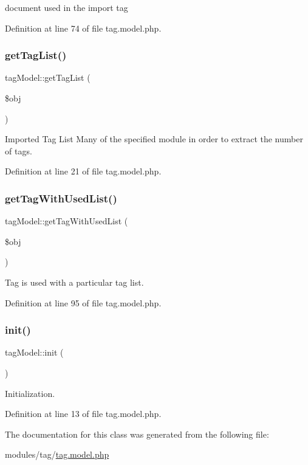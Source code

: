 document used in the import tag 



Definition at line 74 of file tag.\+model.\+php.

\hypertarget{classtagModel_adb9465eef985504d91a2b8673e4339f3}{}\label{classtagModel_adb9465eef985504d91a2b8673e4339f3} 
\subsubsection{\texorpdfstring{get\+Tag\+List()}{getTagList()}}
{\footnotesize\ttfamily tag\+Model\+::get\+Tag\+List (\begin{DoxyParamCaption}\item[{}]{\$obj }\end{DoxyParamCaption})}



Imported Tag List Many of the specified module in order to extract the number of tags. 



Definition at line 21 of file tag.\+model.\+php.

\hypertarget{classtagModel_aa585bee0000c45b8f5a9fbf253926c59}{}\label{classtagModel_aa585bee0000c45b8f5a9fbf253926c59} 
\subsubsection{\texorpdfstring{get\+Tag\+With\+Used\+List()}{getTagWithUsedList()}}
{\footnotesize\ttfamily tag\+Model\+::get\+Tag\+With\+Used\+List (\begin{DoxyParamCaption}\item[{}]{\$obj }\end{DoxyParamCaption})}



Tag is used with a particular tag list. 



Definition at line 95 of file tag.\+model.\+php.

\hypertarget{classtagModel_ad408b1b4892a6637b1ac70250d37b8a6}{}\label{classtagModel_ad408b1b4892a6637b1ac70250d37b8a6} 
\subsubsection{\texorpdfstring{init()}{init()}}
{\footnotesize\ttfamily tag\+Model\+::init (\begin{DoxyParamCaption}{ }\end{DoxyParamCaption})}



Initialization. 



Definition at line 13 of file tag.\+model.\+php.



The documentation for this class was generated from the following file\+:\begin{DoxyCompactItemize}
\item 
modules/tag/\hyperlink{tag_8model_8php}{tag.\+model.\+php}\end{DoxyCompactItemize}
